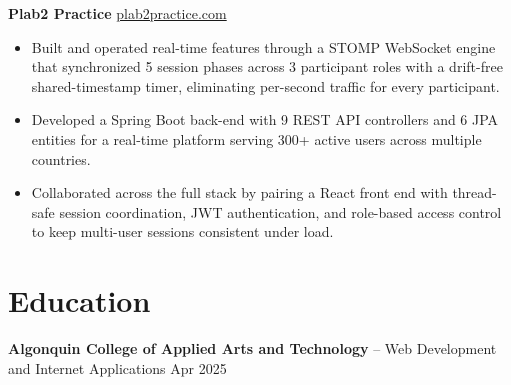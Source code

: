 \documentclass[11pt]{article}       %
\begin{document}
\textbf{Plab2 Practice} \hfill \href{https://plab2practice.com}{plab2practice.com} \\
\vspace{-9pt}
\begin{itemize}
  \item Built and operated real-time features through a STOMP WebSocket engine that synchronized 5 session phases across 3 participant roles with a drift-free shared-timestamp timer, eliminating per-second traffic for every participant.
  \item Developed a Spring Boot back-end with 9 REST API controllers and 6 JPA entities for a real-time platform serving 300+ active users across multiple countries.
  \item Collaborated across the full stack by pairing a React front end with thread-safe session coordination, JWT authentication, and role-based access control to keep multi-user sessions consistent under load.
\end{itemize}





\section*{Education}
\textbf{Algonquin College of Applied Arts and Technology} -- Web Development and Internet Applications
\hfill Apr 2025 \\
\end{document}
